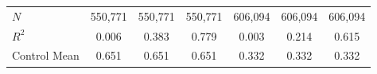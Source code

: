 \documentclass[serif, aspectratio=169]{beamer}
\begin{document}
\begin{frame}
\begin{table}[htbp]
\begin{tabular}{@{}l*{6}{c}@{}}
$\textit{N}$&  550,771         &  550,771         &  550,771         &  606,094         &  606,094         &  606,094         \\
$\textit{R}^2$&    0.006         &    0.383         &    0.779         &    0.003         &    0.214         &    0.615         \\
Control Mean&    0.651         &    0.651         &    0.651         &    0.332         &    0.332         &    0.332         \\
\bottomrule
\end{tabular}
\\
\\
\\

\end{table}

\end{frame}
\end{document}
